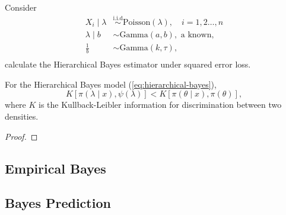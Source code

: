 \begin{example}
	Consider
	\begin{equation}
		\begin{aligned}
			X_i\mid\lambda & \stackrel{\text{i.i.d}}{\sim} \text{Poisson}\left(\lambda\right),\quad i=1,2\ldots,n \\
			\lambda\mid b  & \sim \text{Gamma}\left(a,b\right), \text{ a known},                                  \\
			\frac{1}{b}    & \sim \text{Gamma}\left(k,\tau\right),                                                \\
		\end{aligned}
	\end{equation}
	calculate the Hierarchical Bayes estimator under squared error loss.
\end{example}

\begin{theorem}
	For the Hierarchical Bayes model (\ref{eq:hierarchical-bayes}),
	\begin{equation}
		K\left[\pi\left(\lambda\mid x\right),\psi\left(\lambda\right)\right] < K\left[\pi\left(\theta\mid x\right),\pi\left(\theta\right)\right],
	\end{equation}
	where $K$ is the Kullback-Leibler information for discrimination between two densities.
\end{theorem}

\begin{proof}

\end{proof}

\begin{remark}

\end{remark}

\subsection{Empirical Bayes}

\subsection{Bayes Prediction}
